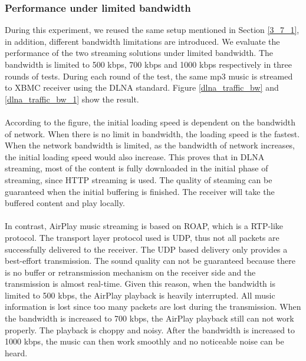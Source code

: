 \subsubsection{Performance under limited bandwidth\label{4_1_2}}
During this experiment, we reused the same setup mentioned in Section \ref{3_7_1}, in addition, different bandwidth limitations are introduced. We evaluate the performance of the two streaming solutions under limited bandwidth. The bandwidth is limited to 500 kbps, 700 kbps and 1000 kbps respectively in three rounds of tests. During each round of the test, the same mp3 music is streamed to XBMC receiver using the DLNA standard. Figure \ref{dlna_traffic_bw} and
\ref{dlna_traffic_bw_1} show the result.\\
\\
According to the figure, the initial loading speed is dependent on the bandwidth of network. When there is no limit in bandwidth, the loading speed is the fastest. When the network bandwidth is limited, as the bandwidth of network increases, the initial loading speed would also increase. This proves that in DLNA streaming, most of the content is fully downloaded in the initial phase of streaming,  since HTTP streaming is used. The quality of steaming can be guaranteed when the initial buffering is finished. The receiver will take the buffered content and play locally.\\
\\
In contrast, AirPlay music streaming is based on ROAP, which is a RTP-like protocol. The transport layer protocol used is UDP, thus not all packets are successfully delivered to the receiver. The UDP based delivery only provides a best-effort transmission. The sound quality can not be guaranteed because there is no buffer or retransmission mechanism on the receiver side and the transmission is almost real-time. Given this reason, when the bandwidth is limited to 500 kbps, the AirPlay playback is heavily interrupted. All music information is lost since too many packets are lost during the transmission. When the bandwidth is increased to 700 kbps, the AirPlay playback still can not work properly. The playback is choppy and noisy. After the bandwidth is increased to 1000 kbps, the music can then work smoothly and no noticeable noise can be heard.\\
\\
